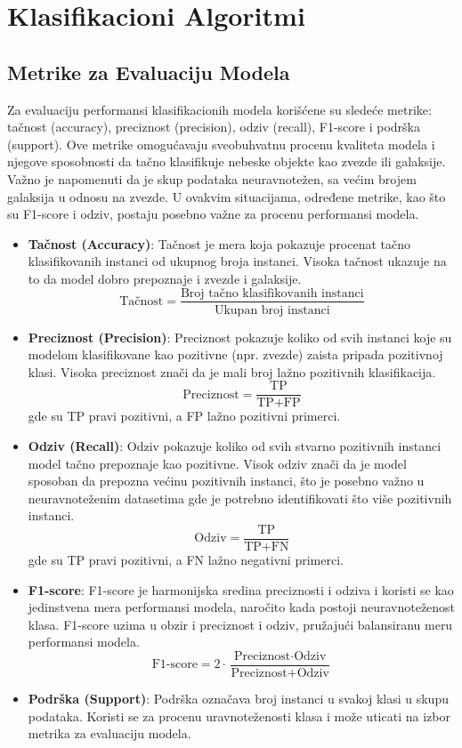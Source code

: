 \documentclass[a4paper,12pt]{article}
\begin{document}
\section{Klasifikacioni Algoritmi}

\subsection{Metrike za Evaluaciju Modela}
Za evaluaciju performansi klasifikacionih modela korišćene su sledeće metrike: tačnost (accuracy), preciznost (precision), odziv (recall), F1-score i podrška (support). Ove metrike omogućavaju sveobuhvatnu procenu kvaliteta modela i njegove sposobnosti da tačno klasifikuje nebeske objekte kao zvezde ili galaksije.\\
Važno je napomenuti da je skup podataka neuravnotežen, sa većim brojem galaksija u odnosu na zvezde. U ovakvim situacijama, određene metrike, kao što su F1-score i odziv, postaju posebno važne za procenu performansi modela.

\begin{itemize}
    \item \textbf{Tačnost (Accuracy)}: Tačnost je mera koja pokazuje procenat tačno klasifikovanih instanci od ukupnog broja instanci. Visoka tačnost ukazuje na to da model dobro prepoznaje i zvezde i galaksije.
    \[
    \text{Tačnost} = \frac{\text{Broj tačno klasifikovanih instanci}}{\text{Ukupan broj instanci}}
    \]
    
    \item \textbf{Preciznost (Precision)}: Preciznost pokazuje koliko od svih instanci koje su modelom klasifikovane kao pozitivne (npr. zvezde) zaista pripada pozitivnoj klasi. Visoka preciznost znači da je mali broj lažno pozitivnih klasifikacija.
    \[
    \text{Preciznost} = \frac{\text{TP}}{\text{TP} + \text{FP}}
    \]
    gde su TP pravi pozitivni, a FP lažno pozitivni primerci.

    \item \textbf{Odziv (Recall)}: Odziv pokazuje koliko od svih stvarno pozitivnih instanci model tačno prepoznaje kao pozitivne. Visok odziv znači da je model sposoban da prepozna većinu pozitivnih instanci, što je posebno važno u neuravnoteženim datasetima gde je potrebno identifikovati što više pozitivnih instanci.
    \[
    \text{Odziv} = \frac{\text{TP}}{\text{TP} + \text{FN}}
    \]
    gde su TP pravi pozitivni, a FN lažno negativni primerci.

    \item \textbf{F1-score}: F1-score je harmonijska sredina preciznosti i odziva i koristi se kao jedinstvena mera performansi modela, naročito kada postoji neuravnoteženost klasa. F1-score uzima u obzir i preciznost i odziv, pružajući balansiranu meru performansi modela.
    \[
    \text{F1-score} = 2 \cdot \frac{\text{Preciznost} \cdot \text{Odziv}}{\text{Preciznost} + \text{Odziv}}
    \]

    \item \textbf{Podrška (Support)}: Podrška označava broj instanci u svakoj klasi u skupu podataka. Koristi se za procenu uravnoteženosti klasa i može uticati na izbor metrika za evaluaciju modela.
\end{itemize}
\end{document}
